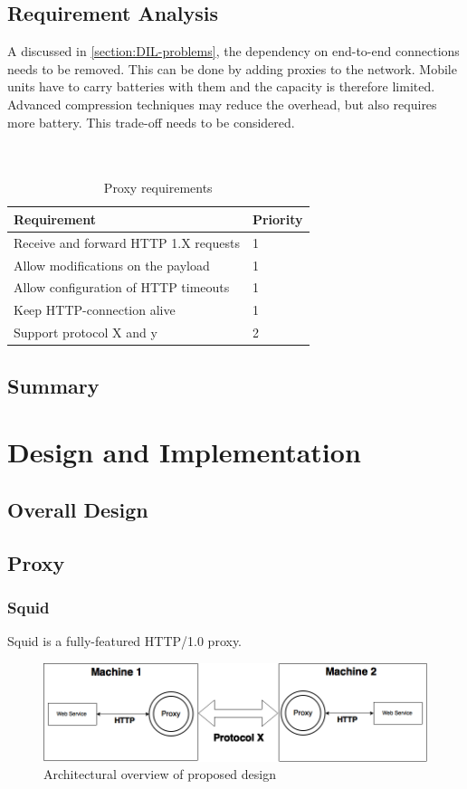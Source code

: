 \documentclass[USenglish]{ifimaster}
\begin{document}
\section{Requirement Analysis}
A discussed in \cref{section:DIL-problems}, the dependency on end-to-end
connections needs to be removed. This can be done by adding proxies to the
network. Mobile units have to carry batteries with them and the capacity is
therefore limited. Advanced compression techniques may reduce the overhead, but
also requires more battery. This trade-off needs to be considered.
\\ \\ \\
\begin{table}[h]
\begin{tabular}{| l | l |}
\hline
  \textbf{Requirement} & \textbf{Priority} \\ \hline
  Receive and forward HTTP 1.X requests & 1\\ \hline
  Allow modifications on the payload & 1 \\ \hline
  Allow configuration of HTTP timeouts & 1 \\ \hline
  Keep HTTP-connection alive & 1 \\ \hline
  Support protocol X and y & 2 \\ \hline
\end{tabular}
\caption{Proxy requirements}
\end{table}

\section{Summary}



\chapter{Design and Implementation}
\section{Overall Design}
\section{Proxy}
\subsection{Squid}
Squid is a fully-featured HTTP/1.0 proxy.
\begin{figure}[h]
\includegraphics[scale=0.4]{images/architecture.png}
\caption{Architectural overview of proposed design}
\end{figure}
\end{document}
